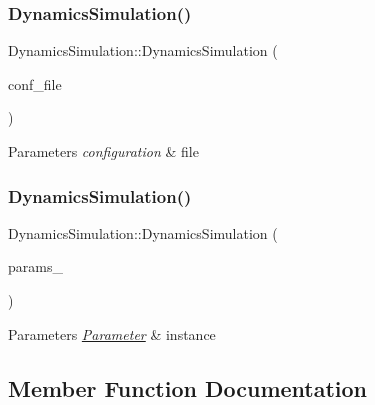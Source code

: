 \subsubsection{\texorpdfstring{Dynamics\+Simulation()}{DynamicsSimulation()}\hspace{0.1cm}{\footnotesize\ttfamily [2/3]}}
{\footnotesize\ttfamily Dynamics\+Simulation\+::\+Dynamics\+Simulation (\begin{DoxyParamCaption}\item[{std\+::string}]{conf\+\_\+file }\end{DoxyParamCaption})}


\begin{DoxyParams}{Parameters}
{\em configuration} & file \\
\hline
\end{DoxyParams}
\mbox{\label{class_dynamics_simulation_a8fd2ec6f3640bff79e4b1ad960bbda5b}} 
\subsubsection{\texorpdfstring{Dynamics\+Simulation()}{DynamicsSimulation()}\hspace{0.1cm}{\footnotesize\ttfamily [3/3]}}
{\footnotesize\ttfamily Dynamics\+Simulation\+::\+Dynamics\+Simulation (\begin{DoxyParamCaption}\item[{\hyperlink{class_parameters}{Parameters} \&}]{params\+\_\+ }\end{DoxyParamCaption})}


\begin{DoxyParams}{Parameters}
{\em \hyperlink{class_parameter}{Parameter}} & instance \\
\hline
\end{DoxyParams}


\subsection{Member Function Documentation}
\mbox{\label{class_dynamics_simulation_a15dfd0453397c12e932bfd29cf36ba74}} 
